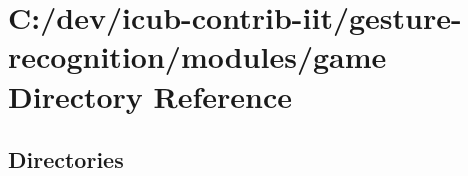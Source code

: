 \section{C\+:/dev/icub-\/contrib-\/iit/gesture-\/recognition/modules/game Directory Reference}
\label{dir_ba814aee3f33baeeb8caf2ca6dbac900}
\subsection*{Directories}
\begin{DoxyCompactItemize}
\end{DoxyCompactItemize}
